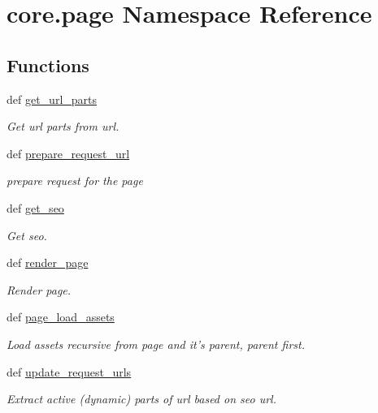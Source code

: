 \hypertarget{namespacecore_1_1page}{\section{core.\-page Namespace Reference}
\label{namespacecore_1_1page}
}
\subsection*{Functions}
\begin{DoxyCompactItemize}
\item 
def \hyperlink{namespacecore_1_1page_a9e61dce694257d383facf992bef51bb5}{get\-\_\-url\-\_\-parts}
\begin{DoxyCompactList}\small\item\em Get url parts from url. \end{DoxyCompactList}\item 
def \hyperlink{namespacecore_1_1page_a779406b9d936864ae1a42062d034a906}{prepare\-\_\-request\-\_\-url}
\begin{DoxyCompactList}\small\item\em prepare request for the page \end{DoxyCompactList}\item 
def \hyperlink{namespacecore_1_1page_ab91be99ed34faf312b42c20548946f00}{get\-\_\-seo}
\begin{DoxyCompactList}\small\item\em Get seo. \end{DoxyCompactList}\item 
def \hyperlink{namespacecore_1_1page_a83bddf354cc2d2742faa3bc73cb5145c}{render\-\_\-page}
\begin{DoxyCompactList}\small\item\em Render page. \end{DoxyCompactList}\item 
def \hyperlink{namespacecore_1_1page_aed1595bd8a98b2ba8bc984fb23dd3607}{page\-\_\-load\-\_\-assets}
\begin{DoxyCompactList}\small\item\em Load assets recursive from page and it's parent, parent first. \end{DoxyCompactList}\item 
def \hyperlink{namespacecore_1_1page_a10d2f6dc57dc1a823e4511afe0f223a0}{update\-\_\-request\-\_\-urls}
\begin{DoxyCompactList}\small\item\em Extract active (dynamic) parts of url based on seo url. \end{DoxyCompactList}\end{DoxyCompactItemize}


